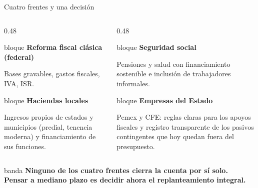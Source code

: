 \documentclass[aspectratio=169,12pt]{beamer}
\newcommand{\frente}[2]{%
    \begin{beamercolorbox}[wd=\linewidth,sep=5pt,rounded=false]{bloque}
      {\color{petroleo}\bfseries #1}\par\vspace{0.2em}\small #2
    \end{beamercolorbox}}
\begin{document}
\begin{frame}{Cuatro frentes y una decisión}
  \vspace{-0.4em}
  \begin{columns}[T]
    \begin{column}{0.48\textwidth}
      \frente{Reforma fiscal clásica (federal)}{Bases gravables, gastos fiscales, IVA, ISR.}\par\vspace{0.35em}
      \frente{Haciendas locales}{Ingresos propios de estados y municipios (predial, tenencia moderna) y financiamiento de sus funciones.}
    \end{column}
    \begin{column}{0.48\textwidth}
      \frente{Seguridad social}{Pensiones y salud con financiamiento sostenible e inclusión de trabajadores informales.}\par\vspace{0.35em}
      \frente{Empresas del Estado}{Pemex y CFE: reglas claras para los apoyos fiscales y registro transparente de los pasivos contingentes que hoy quedan fuera del presupuesto.}
    \end{column}
  \end{columns}
  \vfill
  \begin{beamercolorbox}[wd=\textwidth,sep=8pt,center]{banda}
    \bfseries Ninguno de los cuatro frentes cierra la cuenta por sí solo.\\
    Pensar a mediano plazo es decidir ahora el replanteamiento integral.
  \end{beamercolorbox}
  \vspace*{-0.6em}
\end{frame}
\end{document}
